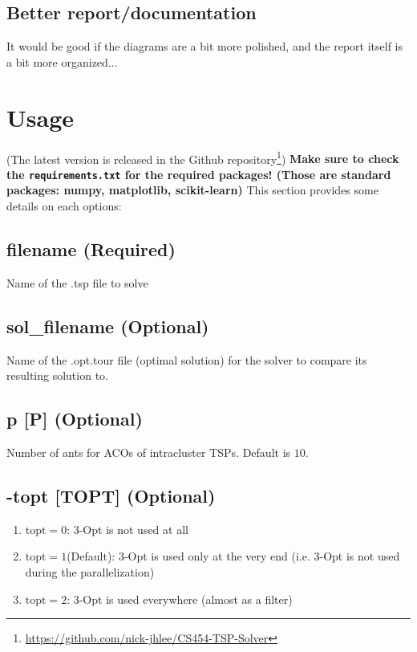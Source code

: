 \documentclass[a4paper]{article}
\begin{document}
{\subsection{Better report/documentation}
It would be good if the diagrams are a bit more polished, and the report itself is a bit more organized...


\newpage
\section{Usage}
\label{sec:usage}
(The latest version is released in the Github repository\footnote{\hyperlink{https://github.com/nick-jhlee/CS454-TSP-Solver}{https://github.com/nick-jhlee/CS454-TSP-Solver}})
{\bf Make sure to check the \texttt{requirements.txt} for the required packages! (Those are standard packages: numpy, matplotlib, scikit-learn)}
This section provides some details on each options:

\subsection{filename (Required)}
Name of the .tsp file to solve

\subsection{sol\_filename (Optional)}
Name of the .opt.tour file (optimal solution) for the solver to compare its resulting solution to.

\subsection{p [P] (Optional)}
Number of ants for ACOs of intracluster TSPs.
Default is $10$.

\subsection{-topt [TOPT] (Optional)}
\begin{enumerate}
	\item $\text{topt} = 0$: 3-Opt is not used at all
	
	\item $\text{topt} = 1$(Default): 3-Opt is used only at the very end (i.e. 3-Opt is not used during the parallelization)
	
	\item $\text{topt} = 2$: 3-Opt is used everywhere (almost as a filter)
\end{enumerate}

}
\end{document}
